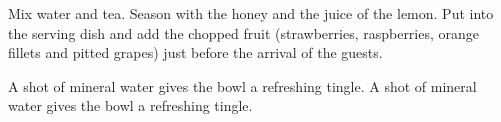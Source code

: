 \documentclass[%
]{article}
\begin{document}
\preparation
{%
    \init Mix water and tea. Season with the honey and the juice of the lemon.
    \init Put into the serving dish and add the chopped fruit (strawberries, raspberries, orange fillets and pitted grapes) just before the arrival of the guests.
}

\hint
{%
    A shot of mineral water gives the bowl a refreshing tingle. A shot of mineral water gives the bowl a refreshing tingle.
}

\graph       %
[%
    recipename=Fruit bowl,
    recipetime={5 min},
    portion={For 4 person},
    joule={1 kJ},
    sgraph=bgraph,
    sdx=-2,
    sdy=0,
    bgraph=sgraph,
    bdx=0,
    bdy=0
]%
\end{document}

